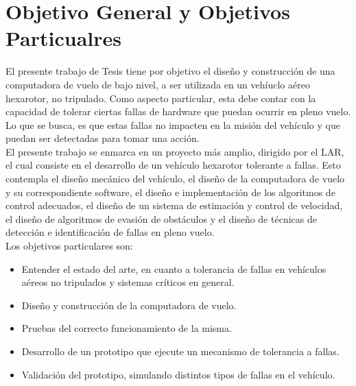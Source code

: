 \section{Objetivo General y Objetivos Particualres}

El presente trabajo de Tesis tiene por objetivo el diseño y construcción de una computadora de vuelo de bajo nivel, a ser utilizada en un vehíuclo aéreo hexarotor, no tripulado. Como aspecto particular, esta debe contar con la capacidad de tolerar ciertas fallas de hardware que puedan ocurrir en pleno vuelo. Lo que se busca, es que estas fallas no impacten en la misión del vehículo y que puedan ser detectadas %
para tomar una acción.\\

El presente trabajo se enmarca en un proyecto más amplio, dirigido por el LAR, el cual consiste en el desarrollo de un vehículo hexarotor tolerante a fallas. Esto contempla el diseño mecánico del vehículo, el diseño de la computadora de vuelo y su correspondiente software, el diseño e implementación de los algoritmos de control adecuados, el diseño de un sistema de estimación y control de velocidad, el diseño de algoritmos de evasión de obstáculos y el diseño de técnicas de detección e identificación de fallas en pleno vuelo.\\

Los objetivos particulares son:

\begin{itemize}
    \item Entender el estado del arte, en cuanto a tolerancia de fallas en vehículos aéreos no tripulados y sistemas críticos en general.
    \item Diseño y construcción de la computadora de vuelo.
    \item Pruebas del correcto funcionamiento de la misma.
    \item Desarrollo de un prototipo que ejecute un mecanismo de tolerancia a fallas.
    \item Validación del prototipo, simulando distintos tipos de fallas en el vehículo.
\end{itemize}